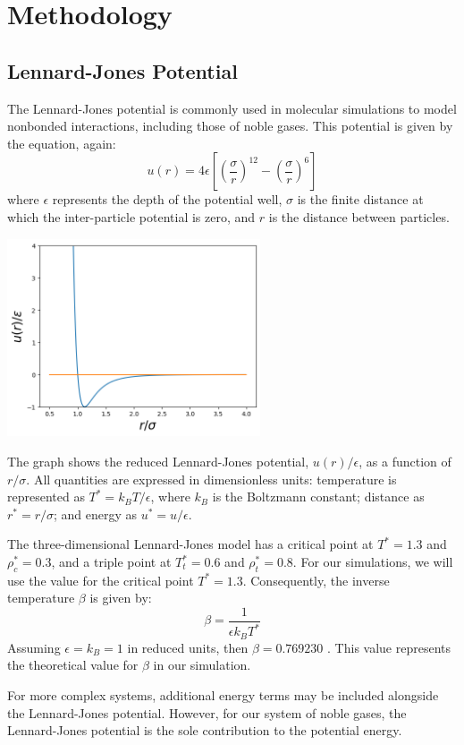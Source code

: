 \documentclass[a4paper,12pt]{article}
\begin{document}
 
\section{Methodology}
\subsection{Lennard-Jones Potential}
The Lennard-Jones potential is commonly used in molecular simulations to model nonbonded interactions, including those of noble gases. This potential is given by the equation, again:
\begin{equation}
    u(r) = 4\epsilon \left[ \left( \frac{\sigma}{r} \right)^{12} - \left( \frac{\sigma}{r} \right)^{6} \right]
\end{equation}
where \( \epsilon \) represents the depth of the potential well, \( \sigma \) is the finite distance at which the inter-particle potential is zero, and \( r \) is the distance between particles.

\begin{multicols}{2}
  
 \includegraphics[width = 7.5cm]{01.png}

The graph shows the reduced Lennard-Jones potential, \( u(r) /\epsilon \), as a function of \( r/\sigma \). All quantities are expressed in dimensionless units: temperature is represented as \( T^* = k_B T/\epsilon \), where \( k_B \) is the Boltzmann constant; distance as \( r^* = r/\sigma \); and energy as \( u^* = u/\epsilon \).

The three-dimensional Lennard-Jones model has a critical point at \( T^* = 1.3 \) and \( \rho^*_c = 0.3 \), and a triple point at \( T^*_t = 0.6 \) and \( \rho^*_t = 0.8 \). For our simulations, we will use the value for the critical point \( T^* = 1.3 \). Consequently, the inverse temperature \( \beta \) is given by:
\begin{equation}
    \beta = \frac{1}{\epsilon k_B T^*}
\end{equation}
Assuming \( \epsilon = k_B = 1 \) in reduced units, then \( \beta = 0.769230 \) \citep{Viot2016}. This value represents the theoretical value for \( \beta \) in our simulation.

For more complex systems, additional energy terms may be included alongside the Lennard-Jones potential. However, for our system of noble gases, the Lennard-Jones potential is the sole contribution to the potential energy.

\end{multicols}
\end{document}
